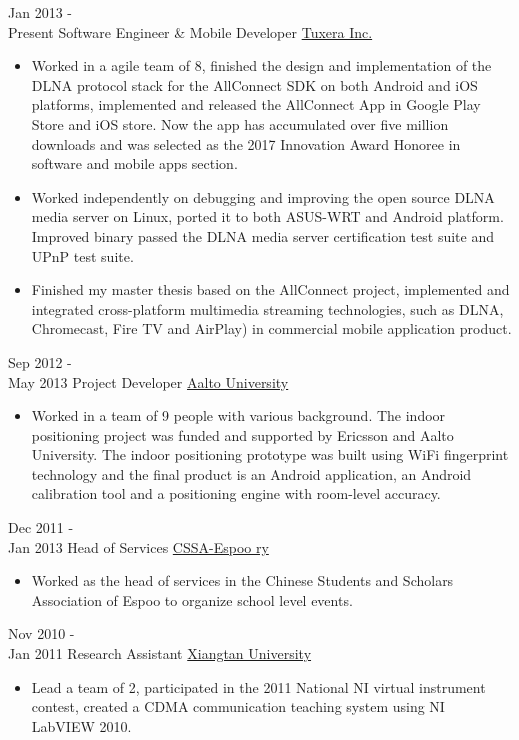 \documentclass[letterpaper]{twentysecondcv} %
\begin{document}
\begin{twenty} %
	\twentyitem
    	{Jan 2013 - \\Present}
        {Software Engineer \& Mobile Developer}
        {\href{http://www.tuxera.com/}{Tuxera Inc.}}
        {}
        {
        {\begin{itemize}
        \item Worked in a agile team of 8, finished the design and implementation of the DLNA protocol stack for the AllConnect SDK on both Android and iOS platforms, implemented and released the AllConnect App in Google Play Store and iOS store. Now the app has accumulated over five million downloads and was selected as the 2017 Innovation Award Honoree in software and mobile apps section.
        \item Worked independently on debugging and improving the open source DLNA media server on Linux, ported it to both ASUS-WRT and Android platform. Improved binary passed the DLNA media server certification test suite and UPnP test suite.
        \item Finished my master thesis based on the AllConnect project, implemented and integrated cross-platform multimedia streaming technologies, such as DLNA, Chromecast, Fire TV and AirPlay) in commercial mobile application product.
    \end{itemize}}
        }
        
    \twentyitem
   		{Sep 2012 - \\ May 2013}
        {Project Developer}
        {\href{http://www.aalto.fi/en/}{Aalto University}}
        {}
        {
        {\begin{itemize}
        \item Worked in a team of 9 people with various background. The indoor positioning project was funded and supported by Ericsson and Aalto University. The indoor positioning prototype was built using WiFi fingerprint technology and the final product is an Android application, an Android calibration tool and a positioning engine with room-level accuracy.
    \end{itemize}}
        }
        
        \twentyitem
   		{Dec 2011 - \\ Jan 2013}
        {Head of Services}
        {\href{https://cssa.ayy.fi/}{CSSA-Espoo ry}}
        {}
        {
        \begin{itemize}
        \item Worked as the head of services in the Chinese Students and Scholars Association of Espoo to organize school level events.
    \end{itemize}
    	}
     \twentyitem
   		{Nov 2010 - \\ Jan 2011}
        {Research Assistant}
        {\href{http://www.xtu.edu.cn/english/}{Xiangtan University}}
        {}
        {
        \begin{itemize}
        \item Lead a team of 2, participated in the 2011 National NI virtual instrument contest, created a CDMA communication teaching system using NI LabVIEW 2010.
    \end{itemize}
    	}
        
\end{twenty}
\end{document}
